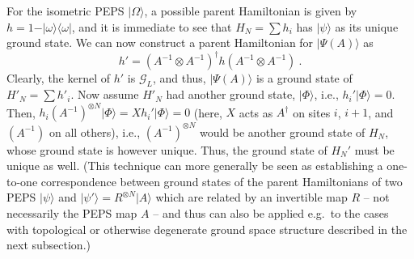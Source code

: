 \documentclass[rmp,aps,reprint,superscriptaddress,nobalancelastpage]{revtex4-1}
\newcommand{\ket}[1]{\vert#1\rangle}
\newcommand{\bra}[1]{\langle#1\vert}
\begin{document}
    For the isometric PEPS $\ket\Omega$, a possible parent Hamiltonian is given by $h=1-\ket{\omega}\bra\omega$, and it is immediate to see that $H_N=\sum h_i$ has $\ket\psi$ as its unique ground state. We can now construct a parent Hamiltonian for $\ket{\Psi(A)}$ as
    \begin{equation}
        \label{eq:4:deformed-parent-1}
        h' = (A^{-1}\otimes A^{-1})^\dagger h (A^{-1}\otimes A^{-1})\ .
    \end{equation}
    Clearly, the kernel of $h'$ is $\mathcal G_L$, and thus, $\ket{\Psi(A)}$ is a ground state of $H'_N=\sum h'_i$. Now assume $H'_N$ had another ground state, $\ket\Phi$, i.e., $h_i'\ket\Phi=0$. Then,
$h_i(A^{-1})^{\otimes N}\ket\Phi = Xh_i'\ket\Phi=0$ (here, $X$ acts as $A^\dagger$ on sites $i$, $i+1$, and $(A^{-1})$ on all others), i.e., $(A^{-1})^{\otimes N}$ would be another ground state of $H_N$, whose ground state is however unique. Thus, the ground state of $H_N'$ must be unique as well. (This technique can more generally be seen as establishing a one-to-one correspondence between ground states of the parent Hamiltonians of two PEPS $\ket\psi$ and $\ket{\psi'}=R^{\otimes N}\ket A$ which are related by an invertible map $R$ -- not necessarily the PEPS map $A$ -- and thus can also be applied e.g.\ to the cases with topological or otherwise degenerate ground space structure described in the next subsection.)
\end{document}
